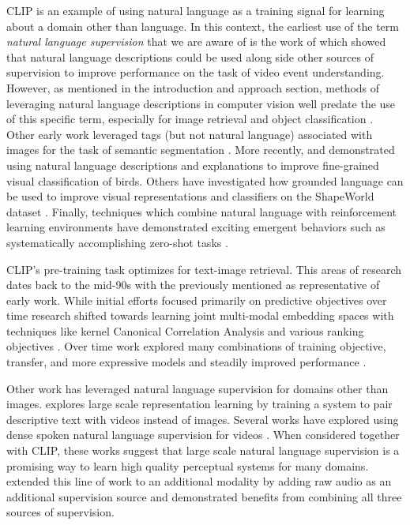 CLIP is an example of using natural language as a training signal for learning about a domain other than language. In this context, the earliest use of the term \textit{natural language supervision} that we are aware of is the work of \citet{ramanathan2013video} which showed that natural language descriptions could be used along side other sources of supervision to improve performance on the task of video event understanding. However, as mentioned in the introduction and approach section, methods of leveraging natural language descriptions in computer vision well predate the use of this specific term, especially for image retrieval \citep{mori1999image} and object classification \citep{wang2009learning}. Other early work leveraged tags (but not natural language) associated with images for the task of semantic segmentation \citep{barnard2003matching}. More recently, \citet{he2017fine} and \citet{liang2020alice} demonstrated using natural language descriptions and explanations to improve fine-grained visual classification of birds. Others have investigated how grounded language can be used to improve visual representations and classifiers on the ShapeWorld dataset \citep{kuhnle2017shapeworld,andreas2017learning,mu2019shaping}. Finally, techniques which combine natural language with reinforcement learning environments \citep{narasimhan2015language} have demonstrated exciting emergent behaviors such as systematically accomplishing zero-shot tasks \citep{hill2019environmental}.

CLIP's pre-training task optimizes for text-image retrieval. This areas of research dates back to the mid-90s with the previously mentioned \citet{mori1999image} as representative of early work. While initial efforts focused primarily on predictive objectives over time research shifted towards learning joint multi-modal embedding spaces with techniques like kernel Canonical Correlation Analysis and various ranking objectives \citep{weston2010large,socher2010connecting,hodosh2013framing}. Over time work explored many combinations of training objective, transfer, and more expressive models and steadily improved performance \citep{frome2013devise,socher2014grounded,karpathy2014deep,kiros2014unifying,faghri2017vse++}.

Other work has leveraged natural language supervision for domains other than images. \citet{stroud2020learning} explores large scale representation learning by training a system to pair descriptive text with videos instead of images. Several works have explored using dense spoken natural language supervision for videos \citep{miech2019howto100m,miech2020end}. When considered together with CLIP, these works suggest that large scale natural language supervision is a promising way to learn high quality perceptual systems for many domains. \citet{alayrac2020self} extended this line of work to an additional modality by adding raw audio as an additional supervision source and demonstrated benefits from combining all three sources of supervision.

